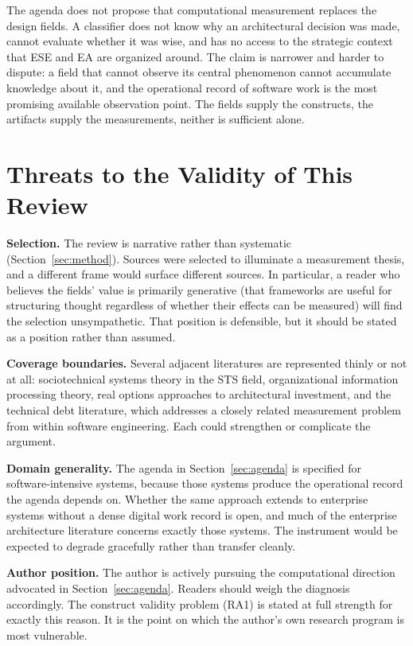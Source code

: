 \documentclass{csimq}
\begin{document}
The agenda does not propose that computational measurement replaces the design
fields. A classifier does not know why an architectural decision was made,
cannot evaluate whether it was wise, and has no access to the strategic context
that ESE and EA are organized around. The claim is narrower and
harder to dispute: a field that cannot observe its central phenomenon cannot
accumulate knowledge about it, and the operational record of software work is
the most promising available observation point. The fields supply the
constructs, the artifacts supply the measurements, neither is sufficient alone.

\section{Threats to the Validity of This Review}
\label{sec:threats}

\textbf{Selection.} The review is narrative rather than systematic
(Section~\ref{sec:method}). Sources were selected to illuminate a measurement
thesis, and a different frame would surface different sources. In particular, a
reader who believes the fields' value is primarily generative (that
frameworks are useful for structuring thought regardless of whether their
effects can be measured) will find the selection unsympathetic. That position
is defensible, but it should be stated as a position rather than assumed.

\textbf{Coverage boundaries.} Several adjacent literatures are represented
thinly or not at all: sociotechnical systems theory in the STS field,
organizational information processing theory, real options approaches to
architectural investment, and the technical debt literature, which addresses a
closely related measurement problem from within software engineering. Each could
strengthen or complicate the argument.

\textbf{Domain generality.} The agenda in Section~\ref{sec:agenda} is specified
for software-intensive systems, because those systems produce the operational
record the agenda depends on. Whether the same approach extends to enterprise
systems without a dense digital work record is open, and much of the enterprise
architecture literature concerns exactly those systems. The instrument would be
expected to degrade gracefully rather than transfer cleanly.

\textbf{Author position.} The author is actively pursuing the computational
direction advocated in Section~\ref{sec:agenda}. Readers should weigh the
diagnosis accordingly. The construct validity problem (RA1) is stated at full
strength for exactly this reason. It is the point on which the author's own
research program is most vulnerable.
\end{document}
